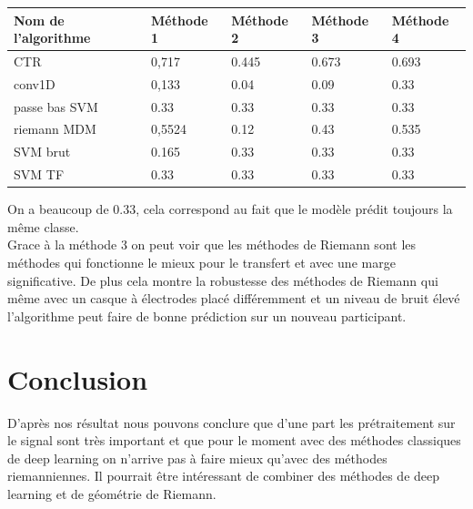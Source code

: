 \documentclass{article}[12pt]
\begin{document}
\begin{table}[H]
\begin{center}
\begin{tabular}{|l|l|l|l|l|}
\hline
Nom de l’algorithme & Méthode 1         & Méthode 2           & Méthode 3          & Méthode 4          \\
\hline
CTR                 & 0,717 & 0.445 & 0.673 & 0.693 \\
conv1D              & 0,133         & 0.04                & 0.09               & 0.33               \\
passe bas SVM       & 0.33                & 0.33                   & 0.33                  & 0.33                  \\
riemann MDM         & 0,5524            & 0.12                & 0.43               & 0.535               \\
SVM brut            & 0.165                 & 0.33                   & 0.33                  & 0.33                  \\
SVM TF              & 0.33                 & 0.33                   & 0.33                  & 0.33      \\
\hline           
\end{tabular}
\end{center}
\end{table}
On a beaucoup de 0.33, cela correspond au fait que le modèle prédit toujours la même classe.\\
Grace à la méthode 3 on peut voir que les méthodes de Riemann sont les méthodes qui fonctionne le mieux pour le transfert et avec une marge significative. De plus cela montre la robustesse des méthodes de Riemann qui même avec un casque à électrodes placé différemment et un niveau de bruit élevé l'algorithme peut faire de bonne prédiction sur un nouveau participant.
\part{Conclusion}
D'après nos résultat nous pouvons conclure que d'une part les prétraitement sur le signal sont très important et que pour le moment avec des méthodes classiques de deep learning on n'arrive pas à faire mieux qu'avec des méthodes riemanniennes. Il pourrait être intéressant de combiner des méthodes de deep learning et de géométrie de Riemann.

 
\end{document}
